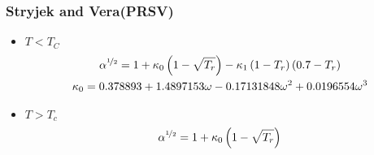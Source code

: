 \subsubsection{Stryjek and Vera(PRSV)\cite{stryjekVeraPureCompounds} }
\begin{itemize}

\item{$T < T_C$}
\begin{gather}
	\alpha^{\nicefrac{1}{2}} = 1 + \kappa_0 \left(1-\sqrt{T_r}\right)- \kappa_1\left(1-T_r\right)\left(0.7-T_r\right)
	\\
	\kappa_0 = 0.378893+1.4897153\omega-0.17131848\omega^2+0.0196554\omega^3
\end{gather}

\item{$T > T_c$}
\begin{equation}
	\alpha^{\nicefrac{1}{2}} = 1 + \kappa_0\left(1- \sqrt{T_r}\right)
\end{equation}

 \end{itemize}